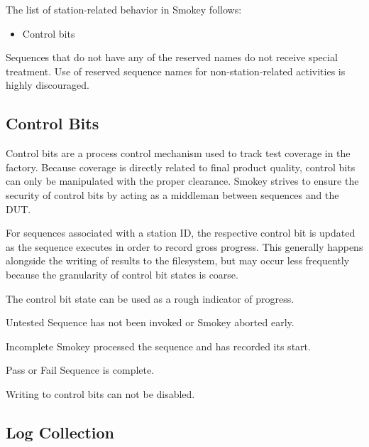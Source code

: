 \documentclass[11pt]{article}
\begin{document}
The list of station-related behavior in Smokey follows:

\begin{itemize}

\item Control bits

\end{itemize}

Sequences that do not have any of the reserved names do not receive special
treatment.  Use of reserved sequence names for non-station-related activities
is highly discouraged.

\subsection{Control Bits}

Control bits are a process control mechanism used to track test coverage in the
factory.  Because coverage is directly related to final product quality,
control bits can only be manipulated with the proper clearance.  Smokey strives
to ensure the security of control bits by acting as a middleman between
sequences and the DUT.

For sequences associated with a station ID, the respective control bit is
updated as the sequence executes in order to record gross progress.  This
generally happens alongside the writing of results to the filesystem, but may
occur less frequently because the granularity of control bit states is coarse.

The control bit state can be used as a rough indicator of progress.

\begin{Definition}

\item[Untested] Sequence has not been invoked or Smokey aborted early.

\item[Incomplete] Smokey processed the sequence and has recorded its start.

\item[Pass \textnormal{or} Fail] Sequence is complete.

\end{Definition}

Writing to control bits can not be disabled.

\subsection{Log Collection}
\end{document}

